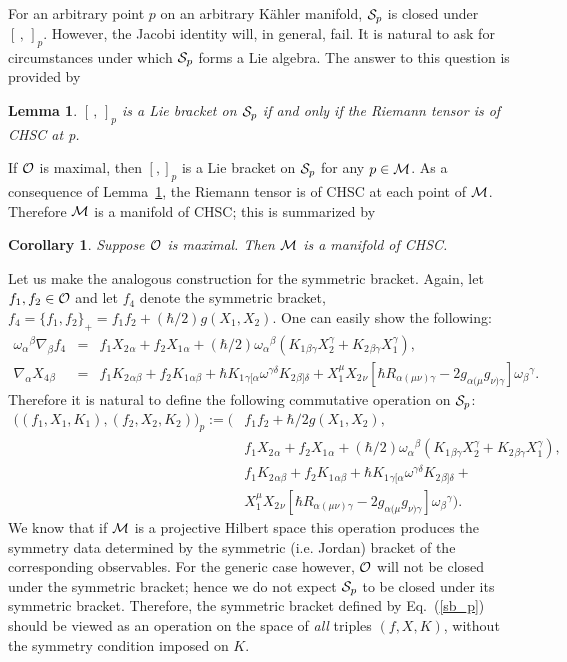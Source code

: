 \documentclass[12pt,aps,eqsecnum,tighten]{revtex4-2}
\newtheorem{lemma}{Lemma}[section]
\def\be{\begin{equation}}
\def\ee{\end{equation}}
\def\ba{\begin{eqnarray}}
\def\ea{\end{eqnarray}}
\def\a{\alpha}
\def\b{\beta}
\def\c{\gamma}
\def\grad{\nabla}
\def\M{{\cal M}}
\def\w{\omega}
\newcommand{\eqn}[1]{Eq.~(\ref{#1})}
\newtheorem{cor}{Corollary}
\begin{document}
For an arbitrary point $p$ on an arbitrary K\"ahler manifold, ${\cal
S}_p$ is closed under $[\, ,\,]_p$.  However, the Jacobi identity
will, in general, fail.  It is natural to ask for circumstances under
which ${\cal S}_p$ forms a Lie algebra.  The answer to this question
is provided by
%
\begin{lemma} \label{lem_jacobi} 
$[\, ,\, ]_p$ is a Lie bracket on ${\cal S}_p$ if and only if the
Riemann tensor is of CHSC at p.
\end{lemma}
%
\noindent
If ${\cal O}$ is maximal, then $[ , ]_p$ is a Lie bracket on ${\cal
S}_p$ for any $p\in\M$.  As a consequence of Lemma~\ref{lem_jacobi},
the Riemann tensor is of CHSC at each point of $\M$.  Therefore $\M$
is a manifold of CHSC; this is summarized by
%
\begin{cor}\label{cor2}
Suppose ${\cal O}$ is maximal.  Then $\M$ is a manifold of CHSC.
\end{cor}
%

Let us make the analogous construction for the symmetric bracket.
Again, let $f_1, f_2 \in {\cal O}$ and let $f_4$ denote the symmetric
bracket, $f_4 = \{f_1, f_2 \}_+ = f_1 f_2 + (\hbar/2) g(X_1, X_2)$. 
One can easily show the following:
%
\ba
	\w_\a{}^\b \grad_\b f_4 &=&
	f_1 X_2{}_\a + f_2 X_1{}_\a + 
	(\hbar/2) \w_\a{}^\b\left(
	K_1{}_{\b\c} X_2^\c + K_2{}_{\b\c} X_1^\c \right),\\
%
	\grad_\a X_4{}_\b &=& 
	f_1 K_2{}_{\a\b} + f_2 K_1{}_{\a\b} +
	\hbar K_1{}_{\c[\a} \w^{\c\delta} K_2{}_{\b]\delta} +
	X_1^\mu X_2{}_\nu\left[
	\hbar R_{\a(\mu\nu)\c} - 2 g_{\a(\mu} g_{\nu)\c}
	\right] \w_\b{}^\c.
\ea
%
Therefore it is natural to define the following commutative operation
on ${\cal S}_p$:
%
\be\label{sb_p}
\begin{array}{ll}
	\big((f_1, X_1, K_1), (f_2, X_2, K_2) \big)_p :=
\bigg( &

	f_1 f_2 + \hbar/2 g( X_1, X_2 ), \\
&	f_1 X_2{}_\a + f_2 X_1{}_\a + 
	(\hbar/2) \w_\a{}^\b\left(
	K_1{}_{\b\c} X_2^\c + K_2{}_{\b\c} X_1^\c \right),\\
&	f_1 K_2{}_{\a\b} + f_2 K_1{}_{\a\b} +
	\hbar K_1{}_{\c[\a} \w^{\c\delta} K_2{}_{\b]\delta}+ \\
&       X_1^\mu X_2{}_\nu  \left[
	\hbar R_{\a(\mu\nu)\c} - 2 g_{\a(\mu} g_{\nu)\c}
		\right] \w_\b{}^\c  \bigg).
\end{array}
\ee
%
We know that if ${\cal M}$ is a projective Hilbert space this
operation produces the symmetry data determined by the symmetric
(i.e. Jordan) bracket of the corresponding observables.  For the
generic case however, ${\cal O}$ will not be closed under the
symmetric bracket; hence we do not expect ${\cal S}_p$ to be closed
under its symmetric bracket.  Therefore, the symmetric bracket defined
by \eqn{sb_p} should be viewed as an operation on the space of {\em
all} triples $(f, X, K)$, without the symmetry condition imposed on
$K$.
\end{document}
